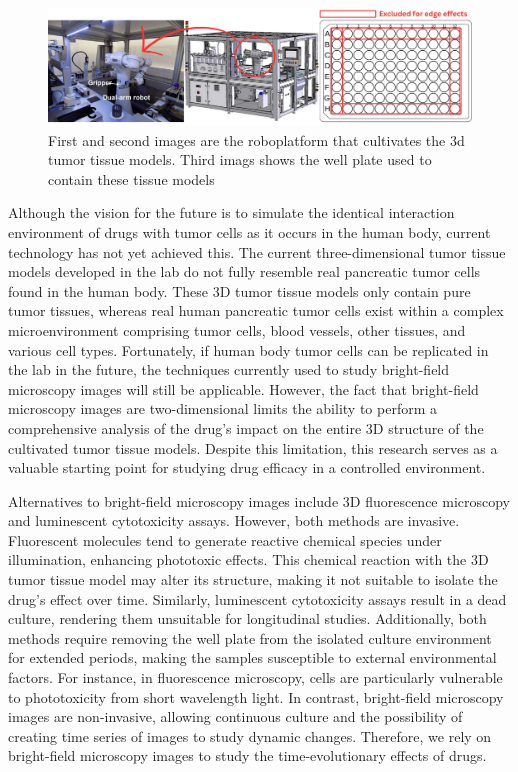  \begin{figure}[H]
  \centering
  \includegraphics[width=\textwidth]{figures/labo.pdf} 
  \caption{First and second images are the roboplatform that cultivates the 3d tumor tissue models. Third imags shows the well plate used to contain these tissue models}
  \label{fig:Roboplatform}
\end{figure}


Although the vision for the future is to simulate the identical interaction environment of drugs with tumor cells as it occurs in the human body, current technology has not yet achieved this. The current three-dimensional tumor tissue models developed in the lab do not fully resemble real pancreatic tumor cells found in the human body. These 3D tumor tissue models only contain pure tumor tissues, whereas real human pancreatic tumor cells exist within a complex microenvironment comprising tumor cells, blood vessels, other tissues, and various cell types.
Fortunately, if human body tumor cells can be replicated in the lab in the future, the techniques currently used to study bright-field microscopy images will still be applicable. However, the fact that bright-field microscopy images are two-dimensional limits the ability to perform a comprehensive analysis of the drug's impact on the entire 3D structure of the cultivated tumor tissue models. Despite this limitation, this research serves as a valuable starting point for studying drug efficacy in a controlled environment. 

Alternatives to bright-field microscopy images include 3D fluorescence microscopy and luminescent cytotoxicity assays. However, both methods are invasive. Fluorescent molecules tend to generate reactive chemical species under illumination, enhancing phototoxic effects. This chemical reaction with the 3D tumor tissue model may alter its structure, making it not suitable to isolate the drug's effect over time. Similarly, luminescent cytotoxicity assays result in a dead culture, rendering them unsuitable for longitudinal studies. Additionally, both methods require removing the well plate from the isolated culture environment for extended periods, making the samples susceptible to external environmental factors. For instance, in fluorescence microscopy, cells are particularly vulnerable to phototoxicity from short wavelength light. In contrast, bright-field microscopy images are non-invasive, allowing continuous culture and the possibility of creating time series of images to study dynamic changes. Therefore, we rely on bright-field microscopy images to study the time-evolutionary effects of drugs.

